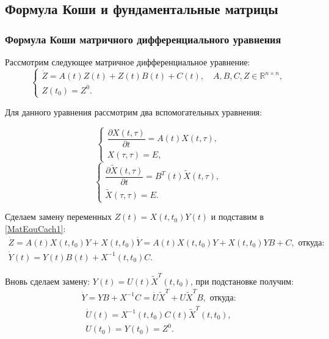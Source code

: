 \subsection{Формула Коши и фундаментальные матрицы}

\subsubsection{Формула Коши матричного дифференциального уравнения}
Рассмотрим следующее матричное дифференциальное уравнение:
\begin{equation}
\label{MatEquCach1}
  \begin{cases}
    \dot{Z} = A(t)Z(t) + Z(t)B(t) + C(t),
      \quad A, B, C, Z \in {\mathbb R}^{n \times n},\\
    Z(t_{0})=Z^{0}.
  \end{cases}
\end{equation}

Для данного уравнения рассмотрим два вспомогательных уравнения:
\begin{multicols}{2}
\begin{equation}
\label{MatHelp1}
  \begin{cases}
    \dfrac{\partial{X(t, \tau)}}{\partial{t}} =
      A(t)X(t, \tau),\\
    X(\tau, \tau) = E,
  \end{cases}
\end{equation}
\begin{equation}
\label{MatHelp2}
  \begin{cases}
    \dfrac{\partial{\widetilde{X}(t, \tau)}}{\partial{t}} =
      B^{T}(t)\widetilde{X}(t, \tau),\\
    \widetilde{X}(\tau, \tau) = E.
  \end{cases}
\end{equation}
\end{multicols}

Сделаем замену переменных
$Z(t) = X(t,t_{0})Y(t)$
и подставим в \eqref{MatEquCach1}:
\begin{gather*}
  \dot{Z} = A(t)X(t, t_{0})Y + X(t, t_{0})\dot{Y} =
            A(t)X(t, t_{0})Y + X(t,t_{0})YB + C,\text{ откуда:}\\
  \dot{Y}(t) = Y(t)B(t) + X^{-1}(t, t_0)C.
\end{gather*}

Вновь сделаем замену: $Y(t) = U(t)\widetilde{X}^{T}(t, t_0)$,
при подстановке получим:
\begin{gather*}
  \dot{Y} = YB + X^{-1}C =
            \dot{U}\widetilde{X}^{T} +
            U\widetilde{X}^{T}B,\text{ откуда:}
\end{gather*}
\begin{gather}
  \label{MatEquCach2}
  \dot{U}(t) = X^{-1}(t, t_0)C(t)\widetilde{X}^{T}(t, t_0),\\
  \label{MatEquCach2Init}
  U(t_0) = Y(t_0) = Z^{0}.
\end{gather}

